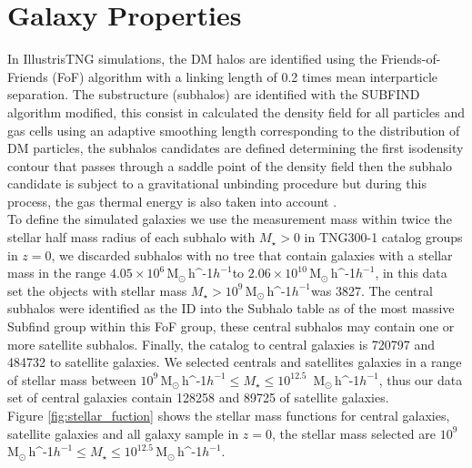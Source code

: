 \documentclass[a4paper,fleqn,usenatbib]{mnras}
\newcommand{\Msunh}{\,{\rm M}$_{\odot}$\,\ifmmode h^{-1}\else $h^{-1}$\fi}
\begin{document}

\section{Galaxy Properties}
\label{sec:galactic_prop}
In IllustrisTNG simulations, the DM halos are identified using the Friends-of-Friends (FoF) algorithm with a linking length of 0.2 times mean interparticle separation. The substructure (subhalos) are identified with the SUBFIND algorithm modified, this consist in calculated the density field for all particles and gas cells using an adaptive smoothing length corresponding to the distribution of DM particles, the subhalos candidates are defined determining the first isodensity contour that passes through a saddle point of the density field then the subhalo candidate is subject to a gravitational unbinding procedure but during this process, the gas thermal energy is also taken into account \citep{2015MNRAS.449...49R}. \\

To define the simulated galaxies we use the measurement mass within twice the stellar half mass radius of each subhalo \citep{2018MNRAS.475..676S} with $M_\star >0$ in TNG300-1 catalog groups in $z=0$, we discarded subhalos with no tree that contain galaxies with a stellar mass in the range $4.05\times 10^{6}$\Msunh to $2.06\times 10^{10}$\Msunh, in this data set the objects with stellar mass $M_\star>10^9$\Msunh was 3827. The central subhalos were identified as the ID into the Subhalo table as of the most massive Subfind group within this FoF group, these central subhalos may contain one or more satellite subhalos. Finally, the catalog to central galaxies is 720797 and 484732 to satellite galaxies. We selected centrals and satellites galaxies in a range of stellar mass between $10^{9}$\Msunh $\leq M_{\star} \leq 10^{12.5}$ \Msunh, thus our data set of central galaxies contain 128258 and 89725 of satellite galaxies.\\

Figure \ref{fig:stellar_fuction} shows the stellar mass functions for central galaxies, satellite galaxies and all galaxy sample in $z=0$, the stellar mass selected are $10^9$\Msunh $\leq M_\star \leq 10^{12.5} $\Msunh.\\
\end{document}
